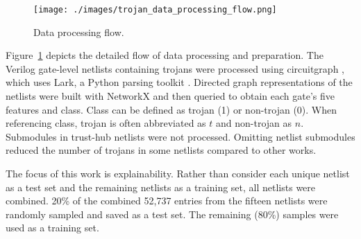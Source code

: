 
\begin{figure}[h]
    \centering
    \texttt{[image: ./images/trojan\_data\_processing\_flow.png]}
    \caption{Data processing flow.}
    \label{fig:data_prep}
\end{figure}

Figure~\ref{fig:data_prep} depicts the detailed flow of data processing and
preparation. The Verilog gate-level netlists containing trojans were processed
using circuitgraph \cite{circuitgraph}, which uses Lark, a Python parsing
toolkit \cite{lark}. Directed graph representations of the netlists were built
with NetworkX \cite{networkx} and then queried to obtain each gate's five
features and class. Class can be defined as trojan (1) or non-trojan (0). When
referencing class, trojan is often abbreviated as $t$ and non-trojan as $n$.
Submodules in trust-hub netlists were not processed. Omitting netlist submodules
reduced the number of trojans in some netlists compared to other works.

The focus of this work is explainability. Rather than consider each unique
netlist as a test set and the remaining netlists as a training set, all netlists
were combined. 20\% of the combined 52,737 entries from the fifteen netlists
were randomly sampled and saved as a test set. The remaining (80\%) samples were
used as a training set\cite{whitten2024naecon}.

